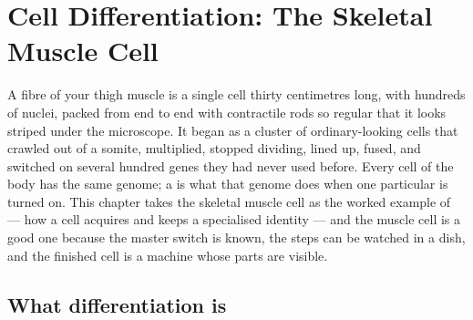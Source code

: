 \chapter{Cell Differentiation: The Skeletal Muscle Cell}\label{ch:b2:cell-differentiation}

A fibre of your thigh muscle is a single cell thirty centimetres
long, with hundreds of nuclei, packed from end to end with
contractile rods so regular that it looks striped under the
microscope. It began as a cluster of ordinary-looking cells that
crawled out of a somite, multiplied, stopped dividing, lined up,
fused, and switched on several hundred genes they had never used
before. Every cell of the body has the same genome; a 
is what that genome does when one particular 
is turned on. This chapter takes the skeletal muscle cell as the
worked example of \emph{} --- how a cell acquires
and keeps a specialised identity --- and the muscle cell is a good
one because the master switch is known, the steps can be watched in
a dish, and the finished cell is a machine whose parts are visible.

\section{What differentiation is}


